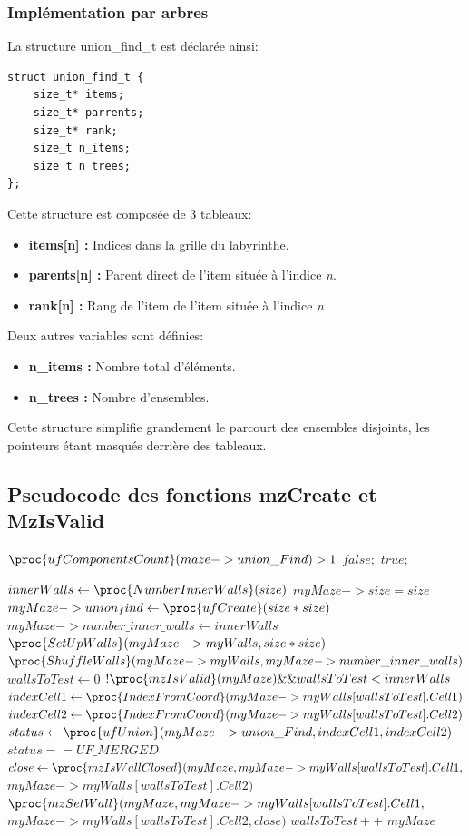 \documentclass[11pt]{article}
\begin{document}
\subsubsection{Implémentation par arbres}

La structure union\_find\_t est déclarée ainsi:
\begin{lstlisting}[style=CStyle]
struct union_find_t {
    size_t* items;
    size_t* parrents;
    size_t* rank;
    size_t n_items;
    size_t n_trees;
};
\end{lstlisting}
Cette structure est composée de 3 tableaux:
\begin{itemize}
\item \textbf{items[n] :} Indices dans la grille du labyrinthe.
\item \textbf{parents[n] :} Parent direct de l'item située à l'indice \emph{n}.
\item \textbf{rank[n] :} Rang de l'item de l'item située à l'indice \emph{n}
\end{itemize}
Deux autres variables sont définies:
\begin{itemize}
\item \textbf{n\_items :} Nombre total d'éléments.
\item \textbf{n\_trees :} Nombre d'ensembles.
\end{itemize}
 
 Cette structure simplifie grandement le parcourt des ensembles disjoints, les pointeurs étant masqués derrière des tableaux.
 

\subsection{Pseudocode des fonctions mzCreate et MzIsValid}

\begin{codebox}
\li    \If $\proc{ufComponentsCount}(maze->union\_Find) > 1$
\li    \Then \Return $false;$
\li    \Else 
\li 		\Return $true;$
\end{codebox}

\begin{codebox}
	\li $innerWalls \gets \proc{NumberInnerWalls}(size)$
	\li $myMaze->size = size$
	\li $myMaze->union_find \gets \proc{ufCreate}(size * size)$
	\li $myMaze->number\_inner\_walls \gets innerWalls$
	\li $\proc{SetUpWalls}(myMaze->myWalls, size*size)$
	\li $\proc{ShuffleWalls}(myMaze->myWalls, myMaze->number\_inner\_walls)$	
	\li $wallsToTest \gets 0$	
	\li \While $!\proc{mzIsValid}(myMaze) \&\& wallsToTest < innerWalls$
	\li \Do $indexCell1 \gets \proc{IndexFromCoord}(myMaze->myWalls[wallsToTest].Cell1)$
	\li 	$indexCell2 \gets \proc{IndexFromCoord}(myMaze->myWalls[wallsToTest].Cell2)$
	\li 	$status \gets \proc{ufUnion}(myMaze->union\_Find, indexCell1, indexCell2)$
	\li 	\If $status == UF\_MERGED$
			\Then
	\li 		$close \gets \proc{mzIsWallClosed}(myMaze, myMaze->myWalls[wallsToTest].Cell1,$ \\$myMaze->myWalls[wallsToTest].Cell2)$
	\li 		$\proc{mzSetWall}(myMaze, myMaze->myWalls[wallsToTest].Cell1,$ \\ $ myMaze->myWalls[wallsToTest].Cell2, close)$
			\End
	\li $wallsToTest++$	
		\End
	\li \Return $myMaze$
\end{codebox}
\end{document}
